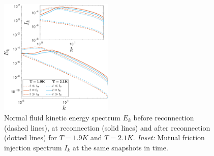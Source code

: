 \documentclass[%
 reprint,
 amsmath,amssymb,
 aps,
 prl,
]{revtex4-2}
\begin{document}
\begin{figure}[b]
    \centering
    \includegraphics*[width=0.48\textwidth]{energy-spec.pdf}
    \caption{Normal fluid kinetic energy spectrum $E_k$ before reconnection (dashed lines), at reconnection (solid lines) and after reconnection (dotted lines) for $T=1.9K$ and $T=2.1K$. \emph{Inset:} Mutual friction injection spectrum $I_k$ at the same snapshots in time.}
    \label{fig:kinetic-energy}
\end{figure}
\end{document}
